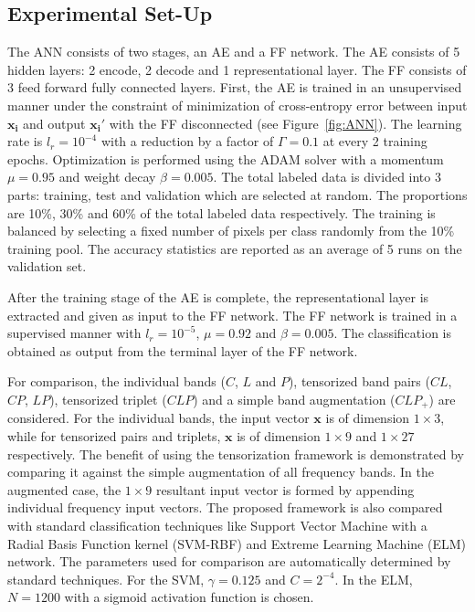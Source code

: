 \subsection{Experimental Set-Up}

The ANN consists of two stages, an AE and a FF network. The AE consists of 5 hidden layers: 2 encode, 2 decode and 1 representational layer. The FF consists of 3 feed forward fully connected layers. First, the AE is trained in an unsupervised manner under the constraint of minimization of cross-entropy error between input $\bm{x_i}$ and output $\bm{x_i'}$ with the FF disconnected (see Figure~\ref{fig:ANN}). The learning rate is $l_r = 10^{-4}$ with a reduction by a factor of $\Gamma=0.1$ at every 2 training epochs. Optimization is performed using the ADAM solver with a momentum $\mu=0.95$ and weight decay $\beta=0.005$. The total labeled data is divided into 3 parts: training, test and validation which are selected at random. The proportions are 10\%, 30\% and 60\% of the total labeled data respectively. The training is balanced by selecting a fixed number of pixels per class randomly from the 10\% training pool.
The accuracy statistics are reported as an average of 5 runs on the validation set.  

After the training stage of the AE is complete, the representational layer is extracted and given as input to the FF network. The FF network is trained in a supervised manner with $l_r = 10^{-5}$, $\mu=0.92$ and $\beta=0.005$. The classification is obtained as output from the terminal layer of the FF network. 

For comparison, the individual bands ($C$, $L$ and $P$), tensorized band pairs ($CL$, $CP$, $LP$),  tensorized triplet ($CLP$) and a simple band augmentation ($CLP_{+}$) are considered. For the individual bands, the input vector $\bm{x}$ is of dimension $1\times3$, while for tensorized pairs and triplets,  $\bm{x}$ is of dimension $1\times9$ and $1\times27$ respectively. 
The benefit of using the tensorization framework is demonstrated by comparing it  against the simple augmentation of all frequency bands. In the augmented case, the $1\times9$ resultant input vector is formed by appending individual frequency input vectors. The proposed framework is also compared with standard classification techniques like Support Vector Machine with a Radial Basis Function kernel (SVM-RBF) and Extreme Learning Machine
(ELM) network. The parameters used for comparison are automatically determined by standard techniques. 
For the SVM, $\gamma=0.125$ and $C=2^{-4}$. In the ELM, $N=1200$ with a sigmoid activation function is chosen.

